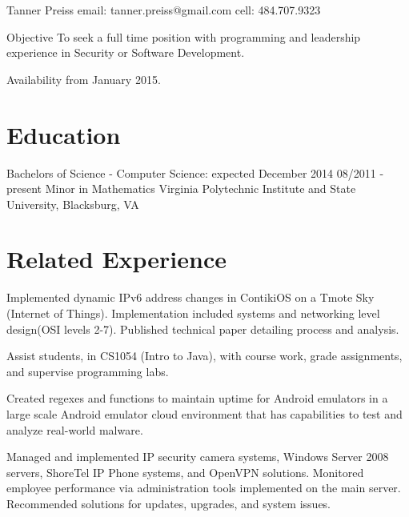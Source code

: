 \documentclass{tpreiss_cv}
\begin{document}
Tanner Preiss
email: tanner.preiss@gmail.com
cell: 484.707.9323

Objective   To seek a full time position with programming and leadership experience in Security or Software Development.

Availability from January 2015.

\section{Education}
Bachelors of Science - Computer Science: expected December 2014 	                                 08/2011 - present
Minor in Mathematics
Virginia Polytechnic Institute and State University, Blacksburg, VA


\section{Related Experience}

Implemented dynamic IPv6 address changes in ContikiOS on a Tmote Sky (Internet of Things). Implementation included systems and networking level design(OSI levels 2-7). Published technical paper detailing process and analysis. 


Assist students, in CS1054 (Intro to Java), with course work, grade assignments, and supervise programming labs.


Created regexes and functions to maintain uptime for Android emulators in a large scale Android emulator cloud environment that has capabilities to test and analyze real-world malware.


Managed and implemented IP security camera systems, Windows Server 2008 servers, ShoreTel IP Phone systems, and OpenVPN solutions. Monitored employee performance via administration tools implemented on    the main server. Recommended solutions for updates, upgrades, and system issues.
\end{document}
